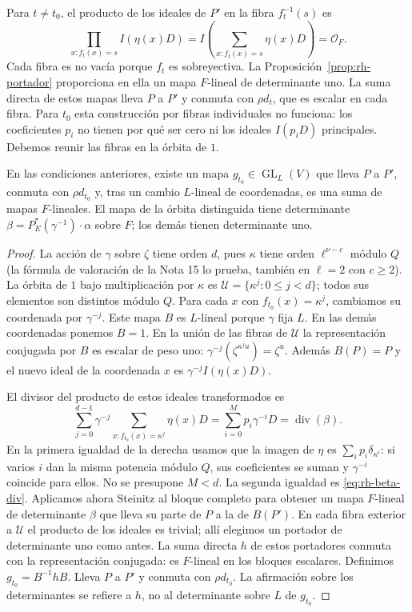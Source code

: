 Para $t\ne t_0$, el producto de los ideales de $P'$ en la fibra $f_t^{-1}(s)$ es
\[
 \prod_{x:f_t(x)=s} I(\eta(x)D)
 = I\left(\sum_{x:f_t(x)=s}\eta(x)D\right)=\mathcal O_F.
\]
Cada fibra es no vacía porque $f_t$ es sobreyectiva. La Proposición~\ref{prop:rh-portador} proporciona en ella un mapa $F$-lineal de determinante uno. La suma directa de estos mapas lleva $P$ a $P'$ y conmuta con $\rho d_t$, que es escalar en cada fibra. Para $t_0$ esta construcción por fibras individuales no funciona: los coeficientes $p_i$ no tienen por qué ser cero ni los ideales $I(p_iD)$ principales. Debemos reunir las fibras en la órbita de $1$.

\begin{proposicion}
\label{prop:rh-orbita}
En las condiciones anteriores, existe un mapa $g_{t_0}\in\operatorname{GL}_L(V)$ que lleva $P$ a $P'$, conmuta con $\rho d_{t_0}$ y, tras un cambio $L$-lineal de coordenadas, es una suma de mapas $F$-lineales. El mapa de la órbita distinguida tiene determinante $\beta=P_E^*(\gamma^{-1})\cdot\alpha$ sobre $F$; los demás tienen determinante uno.
\end{proposicion}
\begin{proof}
La acción de $\gamma$ sobre $\zeta$ tiene orden $d$, pues $\kappa$ tiene orden $\ell^{\nu-c}$ módulo $Q$ (la fórmula de valoración de la Nota 15 lo prueba, también en $\ell=2$ con $c\ge2$). La órbita de $1$ bajo multiplicación por $\kappa$ es $\mathcal U=\{\kappa^j:0\le j<d\}$; todos sus elementos son distintos módulo $Q$. Para cada $x$ con $f_{t_0}(x)=\kappa^j$, cambiamos su coordenada por $\gamma^{-j}$. Este mapa $B$ es $L$-lineal porque $\gamma$ fija $L$. En las demás coordenadas ponemos $B=1$. En la unión de las fibras de $\mathcal U$ la representación conjugada por $B$ es escalar de peso uno: $\gamma^{-j}(\zeta^{\kappa^j u})=\zeta^u$. Además $B(P)=P$ y el nuevo ideal de la coordenada $x$ es $\gamma^{-j}I(\eta(x)D)$.

El divisor del producto de estos ideales transformados es
\[
 \sum_{j=0}^{d-1}\gamma^{-j}
       \sum_{x:f_{t_0}(x)=\kappa^j}\eta(x)D
 =\sum_{i=0}^{M}p_i\gamma^{-i}D
 =\operatorname{div}(\beta).
\]
En la primera igualdad de la derecha usamos que la imagen de $\eta$ es $\sum_i p_i\delta_{\kappa^i}$: si varios $i$ dan la misma potencia módulo $Q$, sus coeficientes se suman y $\gamma^{-i}$ coincide para ellos. No se presupone $M<d$. La segunda igualdad es \eqref{eq:rh-beta-div}. Aplicamos ahora Steinitz al bloque completo para obtener un mapa $F$-lineal de determinante $\beta$ que lleva su parte de $P$ a la de $B(P')$. En cada fibra exterior a $\mathcal U$ el producto de los ideales es trivial; allí elegimos un portador de determinante uno como antes. La suma directa $h$ de estos portadores conmuta con la representación conjugada: es $F$-lineal en los bloques escalares. Definimos $g_{t_0}=B^{-1}hB$. Lleva $P$ a $P'$ y conmuta con $\rho d_{t_0}$. La afirmación sobre los determinantes se refiere a $h$, no al determinante sobre $L$ de $g_{t_0}$.
\end{proof}

